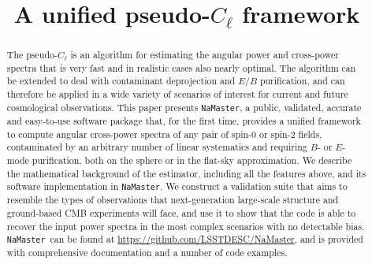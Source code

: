 \documentclass[usenatbib]{mnrasb}
\newcommand{\nmt}{{\tt NaMaster}}
\begin{document}
\title{A unified pseudo-$C_\ell$ framework}

\maketitlepre

\begin{abstract}
  The pseudo-$C_\ell$ is an algorithm for estimating the angular power and cross-power spectra that is very fast and in realistic cases also nearly optimal. The algorithm can be extended to deal with contaminant deprojection and $E/B$ purification, and can therefore be applied in a wide variety of scenarios of interest for current and future cosmological observations. This paper presents \nmt, a public, validated, accurate and easy-to-use software package that, for the first time, provides a unified framework to compute angular cross-power spectra of any pair of spin-0 or spin-2 fields, contaminated by an arbitrary number of linear systematics and requiring $B$- or $E$-mode purification, both on the sphere or in the flat-sky approximation. We describe the mathematical background of the estimator, including all the features above, and its software implementation in \nmt. We construct a validation suite that aims to resemble the types of observations that next-generation large-scale structure and ground-based CMB experiments will face, and use it to show that the code is able to recover the input power spectra in the most complex scenarios with no detectable bias. \nmt~can be found at \url{https://github.com/LSSTDESC/NaMaster}, and is provided with comprehensive documentation and a number of code examples.
\end{abstract}


\maketitlepost
\end{document}
